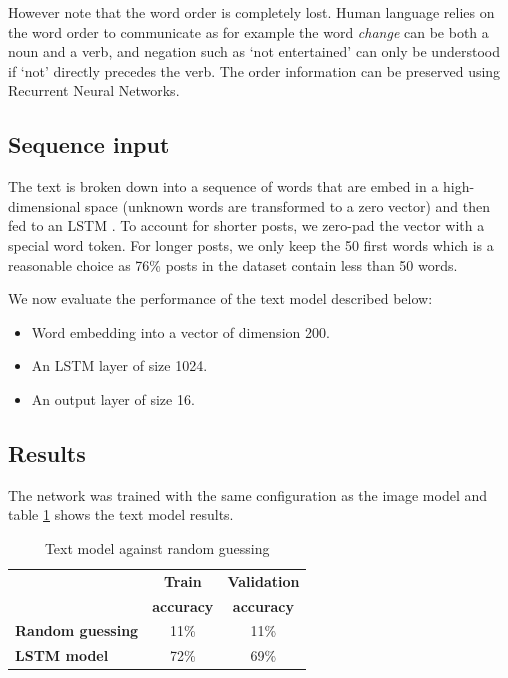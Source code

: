 \documentclass{article} %
\begin{document}
However note that the word order is completely lost. Human language relies on the word order to communicate as for example the word {\em change} can be both a noun and a verb, and negation such as `not entertained' can only be understood if `not' directly precedes the verb. The order information can be preserved using Recurrent Neural Networks.

\subsection{Sequence input}
The text is broken down into a sequence of words that are embed in a high-dimensional space (unknown words are transformed to a zero vector) and then fed to an LSTM \citep{Hochreiter-97}. To account for shorter posts, we zero-pad the vector with a special word token. For longer posts, we only keep the 50 first words which is a reasonable choice as 76\% posts in the dataset contain less than 50 words.

We now evaluate the performance of the text model described below:
\begin{itemize}
    \item Word embedding into a vector of dimension 200.
    \item An LSTM layer of size 1024.
    \item An output layer of size 16.
\end{itemize}

\subsection{Results}
The network was trained with the same configuration as the image model and table \ref{text-results} shows the text model results.

\begin{table}[H]
\caption{Text model against random guessing}
\begin{center}
    \begin{tabular}{l | c | c}
    & \textbf{Train} & \textbf{Validation} \\
    & \textbf{accuracy} & \textbf{accuracy} \\ \hline
    \textbf{Random guessing} & 11\% & 11\% \\ \hline
    \textbf{LSTM model}  & 72\% & 69\% \\
    \end{tabular}
\end{center}
\label{text-results}
\end{table}
\end{document}
